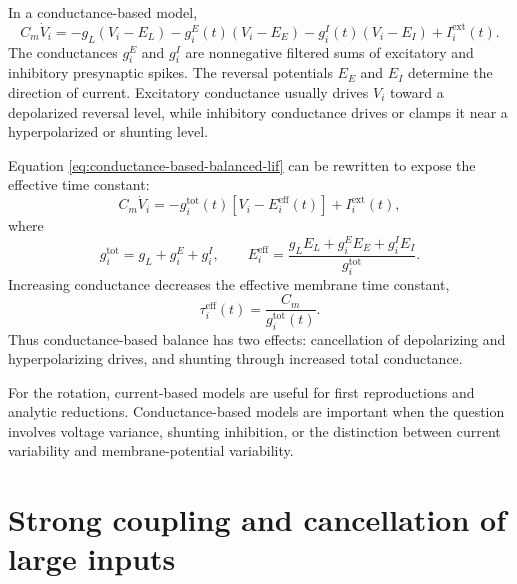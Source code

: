 In a conductance-based model,
%
\begin{equation}
  C_m\dot V_i
  =
  -g_L(V_i-E_L)
  -
  g_i^E(t)(V_i-E_E)
  -
  g_i^I(t)(V_i-E_I)
  +
  I_i^{\mathrm{ext}}(t).
  \label{eq:conductance-based-balanced-lif}
\end{equation}
%
The conductances $g_i^E$ and $g_i^I$ are nonnegative filtered sums of excitatory and inhibitory presynaptic spikes. The reversal potentials $E_E$ and $E_I$ determine the direction of current. Excitatory conductance usually drives $V_i$ toward a depolarized reversal level, while inhibitory conductance drives or clamps it near a hyperpolarized or shunting level.

Equation \cref{eq:conductance-based-balanced-lif} can be rewritten to expose the effective time constant:
%
\begin{equation}
  C_m\dot V_i
  =
  -g_i^{\mathrm{tot}}(t)
  \left[
    V_i-E_i^{\mathrm{eff}}(t)
  \right]
  +
  I_i^{\mathrm{ext}}(t),
  \label{eq:conductance-effective-form}
\end{equation}
%
where
%
\begin{equation}
  g_i^{\mathrm{tot}}
  =
  g_L+g_i^E+g_i^I,
  \qquad
  E_i^{\mathrm{eff}}
  =
  \frac{g_L E_L+g_i^E E_E+g_i^I E_I}{g_i^{\mathrm{tot}}}.
  \label{eq:conductance-effective-quantities}
\end{equation}
%
Increasing conductance decreases the effective membrane time constant,
%
\begin{equation}
  \tau_i^{\mathrm{eff}}(t)
  =
  \frac{C_m}{g_i^{\mathrm{tot}}(t)}.
  \label{eq:conductance-effective-time-constant}
\end{equation}
%
Thus conductance-based balance has two effects: cancellation of depolarizing and hyperpolarizing drives, and shunting through increased total conductance.

For the rotation, current-based models are useful for first reproductions and analytic reductions. Conductance-based models are important when the question involves voltage variance, shunting inhibition, or the distinction between current variability and membrane-potential variability.

\section{Strong coupling and cancellation of large inputs}
\label{sec:strong-coupling-cancellation}

